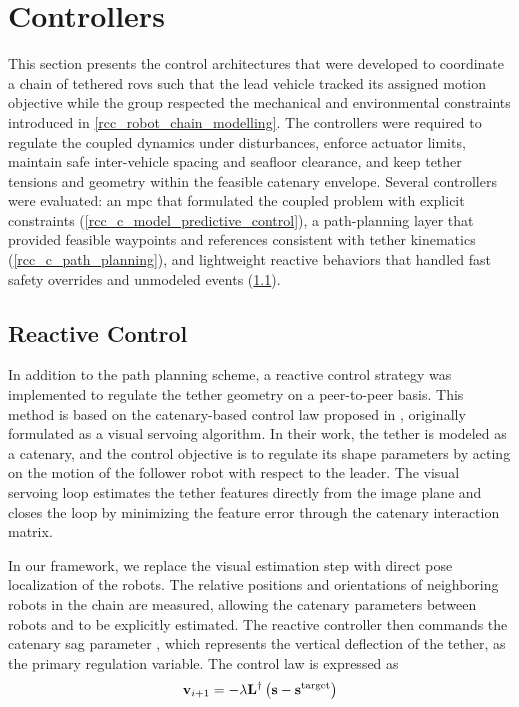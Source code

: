\section{Controllers}
\label{rcc_controllers}

This section presents the control architectures that were developed to coordinate a chain of
tethered \acp{rov} such that the lead vehicle tracked its assigned motion objective while the group
respected the mechanical and environmental constraints introduced in
\cref{rcc_robot_chain_modelling}. The controllers were required to regulate the coupled dynamics
under disturbances, enforce actuator limits, maintain safe inter-vehicle spacing and seafloor
clearance, and keep tether tensions and geometry within the feasible catenary envelope. Several
controllers were evaluated: an \ac{mpc} that formulated the coupled problem with explicit
constraints (\cref{rcc_c_model_predictive_control}), a path-planning layer that provided feasible
waypoints and references consistent with tether kinematics (\cref{rcc_c_path_planning}), and
lightweight reactive behaviors that handled fast safety overrides and unmodeled events
(\cref{rcc_c_reactive_control}).

\subsection{Reactive Control}
\label{rcc_c_reactive_control}

In addition to the path planning scheme, a reactive control strategy was implemented to regulate
the tether geometry on a peer-to-peer basis. This method is based on the catenary-based control law
proposed in \cite{laranjeiraCatenarybasedVisualServoing2017}, originally formulated as a visual
servoing algorithm. In their work, the tether is modeled as a catenary, and the control objective
is to regulate its shape parameters by acting on the motion of the follower robot with respect to
the leader. The visual servoing loop estimates the tether features directly from the image plane
and closes the loop by minimizing the feature error through the catenary interaction matrix.

In our framework, we replace the visual estimation step with direct pose localization of the
robots. The relative positions and orientations of neighboring robots in the chain are measured,
allowing the catenary parameters between robots  and  to be explicitly estimated.
The reactive controller then commands the catenary sag parameter , which
represents the vertical deflection of the tether, as the primary regulation variable. The control
law is expressed as
\begin{align}
	\ldvect{v}{i+1} = - \lambda \lrumatr{L}{\dagger} \left(
	\vect{s} - \luvect{s}{\text{target}}
	\right)
	\label{rcc_c_rc_law}
\end{align}

